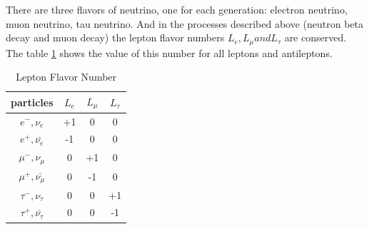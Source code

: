 There are three flavors of neutrino, one for each generation: electron neutrino, muon neutrino, tau neutrino. And in the processes described above (neutron beta decay and muon decay) the lepton flavor numbers $L_e, L_{\mu} and L_{\tau}$ are conserved. The table \ref{tab:LeptonFlavorNumber} shows the value of this number for all leptons and antileptons. 

\begin{table}[h]
  \begin{center}
  \caption{ Lepton Flavor Number}
  \begin{tabular}{|c|c|c|c|}
     particles & $L_e$ & $L_{\mu}$ & $L_{\tau}$ \\ \hline
     $e^-,\nu_e$ &  +1  &  0  &  0  \\ \hline 
     $e^+, \bar{\nu_e}$ &  -1  &  0  &  0  \\ \hline 
     $\mu^-,\nu_{\mu}$ &  0  &  +1  &  0  \\ \hline 
     $\mu^+, \bar{\nu_{\mu}}$ &  0  &  -1  &  0  \\ \hline 
     $\tau^-,\nu_{\tau}$ &  0  &  0  &  +1  \\ \hline 
     $\tau^+, \bar{\nu_{\tau}}$ &  0  &  0  &  -1  \\ \hline 
  \end{tabular}
  \label{tab:LeptonFlavorNumber}
  \end{center}
\end{table}
